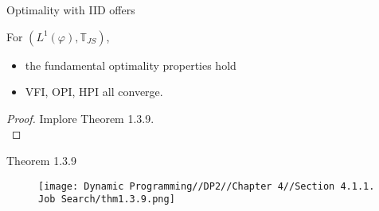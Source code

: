 \documentclass[aspectratio=169]{beamer} %
\begin{document}
\begin{frame}{Optimality with IID offers}
    \begin{theorem}
        For $(L^1(\varphi),\mathbb{T}_{JS})$,
        \begin{itemize}
            \item the fundamental optimality properties hold
            \item VFI, OPI, HPI all converge.
        \end{itemize}
    \end{theorem}

    \begin{proof}
    Implore Theorem 1.3.9.\\
\end{proof}

\end{frame}


\begin{frame}{Theorem 1.3.9}

    \begin{figure}
        \centering
        \texttt{[image: Dynamic Programming//DP2//Chapter 4//Section 4.1.1. Job Search/thm1.3.9.png]}
    \end{figure}


\end{frame}




\end{document}
